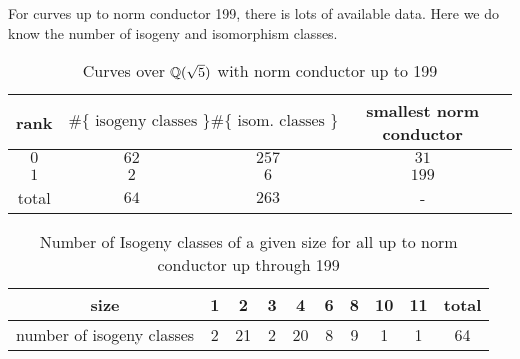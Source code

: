 \documentclass{amsart}
\begin{document}
For curves up to norm conductor 199, 
there is lots of available data.  
Here we do know the number of isogeny and isomorphism classes.

\begin{center}
\begin{table}[h]
\caption{Curves over $\mathbb{Q}(\sqrt{5})$ with norm conductor up to 199\label{table:counts}}
\begin{tabular}{|c|c|c|c|}\hline
rank & $\#\{\text{ isogeny classes }\}$ &  $\#\{\text{ isom. classes }\}$ & smallest norm conductor\\\hline
 $0$ & $62$ & $257$ & $31$\\\hline
 $1$ & $2$ & $6$ & $199$\\\hline
total & $64$ & $263$ & - \\\hline
\end{tabular}
\end{table}
\end{center}



\begin{center}
\begin{table}[h]
\caption{Number of Isogeny classes of a given size for all up to norm conductor up through 199\label{table:counts}}
\begin{tabular}{|c|c|c|c|c|c|c|c|c|c|}\hline
size & 1 & 2 & 3 & 4 & 6 & 8 & 10 & 11 & total \\ \hline
number of isogeny classes & 2 & 21 & 2 & 20 & 8 & 9 & 1 & 1 & 64 \\\hline
\end{tabular}
\end{table}
\end{center}
\end{document}
